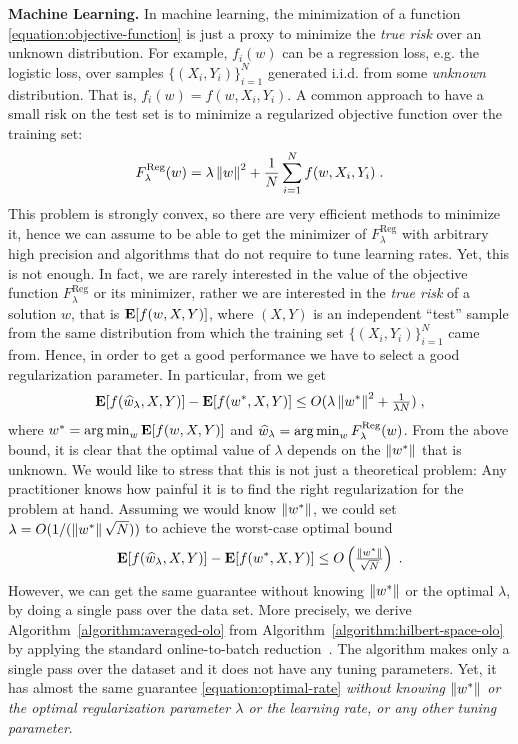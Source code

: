 \textbf{Machine Learning.} In machine learning, the minimization of a function
\eqref{equation:objective-function} is just a proxy to minimize the \emph{true
risk} over an unknown distribution. For example, $f_i(w)$ can be a
regression loss, e.g. the logistic loss, over samples $\{(X_i,
Y_i)\}_{i=1}^N$ generated i.i.d. from some \emph{unknown} distribution.
That is, $f_i(w)=f(w,X_i,Y_i)$. A common approach to
have a small risk on the test set is to minimize a regularized objective
function over the training set:
%
\begin{equation}
\label{equation:reg_logloss}
F_\lambda^{\text{Reg}}(w) = \lambda \left\|{w}\right\|^2 + \frac{1}{N} \sum_{i=1}^N f(w, X_i, Y_i) \; .
\end{equation}
%
This problem is strongly convex, so there are very efficient methods to
minimize it, hence we can assume to be able to get the minimizer of
$F_\lambda^{\text{Reg}}$ with arbitrary high precision and algorithms that do not require to tune learning rates. Yet, this is not
enough. In fact, we are rarely interested in the value of the objective
function $F_\lambda^{\text{Reg}}$ or its minimizer, rather we are interested in
the \emph{true risk} of a solution $w$, that is $\operatorname*{\mathbf{E}}[f(w,X,Y)]$, where $(X,Y)$
is an independent ``test'' sample from the same distribution from which the
training set $\{(X_i,Y_i)\}_{i=1}^N$ came from. Hence, in order to get a good
performance we have to select a good regularization parameter. In particular,
from \cite{Sridharan-Shalev-Shwartz-Srebro-2009} we get
\[
\operatorname*{\mathbf{E}}[f(\widehat{w}_\lambda,X,Y)] - \operatorname*{\mathbf{E}}[f(w^*,X,Y)] \le O(\lambda \left\|{w^*}\right\|^2 + \tfrac{1}{\lambda N}) \; ,
\]
where $w^*=\operatorname*{arg\,min}_w \operatorname*{\mathbf{E}}[f(w,X,Y)]$ and $\widehat{w}_\lambda = \operatorname*{arg\,min}_w
F_\lambda^{\text{Reg}}(w)$.  From the above bound, it is clear that the optimal value
of $\lambda$ depends on the $\left\|{w^*}\right\|$ that is unknown. We would like to
stress that this is not just a theoretical problem: Any practitioner knows how
painful it is to find the right regularization for the problem at hand.
Assuming we would know $\left\|{w^*}\right\|$, we could set $\lambda = O(1/(\left\|{w^*}\right\|
\sqrt{N}))$ to achieve the worst-case optimal bound
%
\begin{equation}
\label{equation:optimal-rate}
\operatorname*{\mathbf{E}}[f(\widehat{w}_\lambda,X,Y)] - \operatorname*{\mathbf{E}}[f(w^*,X,Y)] \le O\left(\tfrac{\left\|{w^*}\right\|}{\sqrt{N}}\right) \; .
\end{equation}
However, we can get the same guarantee without knowing $\left\|{w^*}\right\|$ or the optimal $\lambda$,
by doing a single pass over the data set. More precisely, we derive
Algorithm~\ref{algorithm:averaged-olo} from
Algorithm~\ref{algorithm:hilbert-space-olo} by applying the standard
online-to-batch reduction~\citep{Shalev-Shwartz-2011}.  The algorithm makes
only a single pass over the dataset and it does not have any tuning parameters.
Yet, it has almost the same guarantee \eqref{equation:optimal-rate}
\emph{without knowing $\left\|{w^*}\right\|$ or the optimal regularization parameter
$\lambda$ or the learning rate, or any other tuning parameter}.

